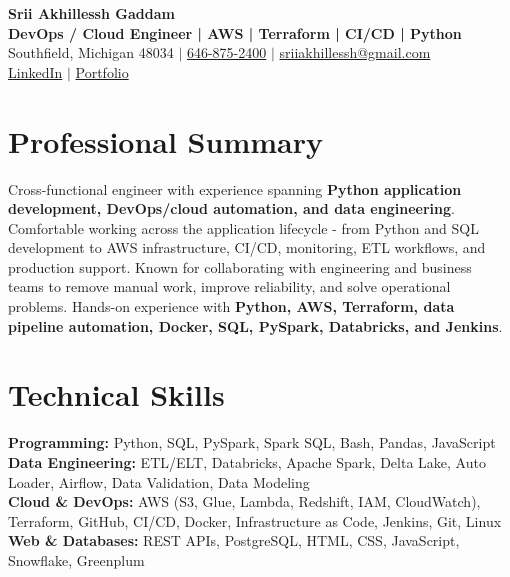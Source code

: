 \documentclass[letterpaper,10pt]{article}
\begin{document}
\fontsize{9.35pt}{10.45pt}\selectfont

\begin{center}
    {\LARGE \textbf{Srii Akhillessh Gaddam}} \\[-1pt]
    \textbf{DevOps / Cloud Engineer | AWS | Terraform | CI/CD | Python} \\[2pt]
    Southfield, Michigan 48034 $|$
    \href{tel:6468752400}{646-875-2400} $|$
    \href{mailto:sriiakhillessh@gmail.com}{sriiakhillessh@gmail.com} \\[1pt]
    \href{https://www.linkedin.com/in/srii-akhiilessh-gaddam-b48668191/}{LinkedIn} $|$
    \href{https://sriiakhillesshg.github.io/portfolio/}{Portfolio}
\end{center}
\vspace{-8pt}

\section{Professional Summary}
\small{Cross-functional engineer with experience spanning \textbf{Python application development, DevOps/cloud automation, and data engineering}. Comfortable working across the application lifecycle - from Python and SQL development to AWS infrastructure, CI/CD, monitoring, ETL workflows, and production support. Known for collaborating with engineering and business teams to remove manual work, improve reliability, and solve operational problems. Hands-on experience with \textbf{Python, AWS, Terraform, data pipeline automation, Docker, SQL, PySpark, Databricks, and Jenkins}.}

\section{Technical Skills}
\small{
\textbf{Programming:} Python, SQL, PySpark, Spark SQL, Bash, Pandas, JavaScript \\
\textbf{Data Engineering:} ETL/ELT, Databricks, Apache Spark, Delta Lake, Auto Loader, Airflow, Data Validation, Data Modeling \\
\textbf{Cloud \& DevOps:} AWS (S3, Glue, Lambda, Redshift, IAM, CloudWatch), Terraform, GitHub, CI/CD, Docker, Infrastructure as Code, Jenkins, Git, Linux \\
\textbf{Web \& Databases:} REST APIs, PostgreSQL, HTML, CSS, JavaScript, Snowflake, Greenplum
}
\end{document}
